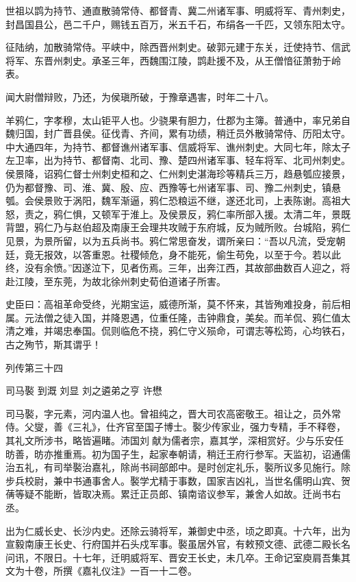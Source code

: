 \documentclass[12pt,UTF8]{ctexbook}
\begin{document}
世祖以鹍为持节、通直散骑常侍、都督青、冀二州诸军事、明威将军、青州刺史，封昌国县公，邑二千户，赐钱五百万，米五千石，布绢各一千匹，又领东阳太守。

征陆纳，加散骑常侍。平峡中，除西晋州刺史。破郭元建于东关，迁使持节、信武将军、东晋州刺史。承圣三年，西魏围江陵，鹍赴援不及，从王僧愔征萧勃于岭表。

闻大尉僧辩败，乃还，为侯瑱所破，于豫章遇害，时年二十八。

羊鸦仁，字孝穆，太山钜平人也。少骁果有胆力，仕郡为主簿。普通中，率兄弟自魏归国，封广晋县侯。征伐青、齐间，累有功绩，稍迁员外散骑常侍、历阳太守。中大通四年，为持节、都督谯州诸军事、信威将军、谯州刺史。大同七年，除太子左卫率，出为持节、都督南、北司、豫、楚四州诸军事、轻车将军、北司州刺史。侯景降，诏鸦仁督士州刺史桓和之、仁州刺史湛海珍等精兵三万，趋悬瓠应接景，仍为都督豫、司、淮、冀、殷、应、西豫等七州诸军事、司、豫二州刺史，镇悬瓠。会侯景败于涡阳，魏军渐逼，鸦仁恐粮运不继，遂还北司，上表陈谢。高祖大怒，责之，鸦仁惧，又顿军于淮上。及侯景反，鸦仁率所部入援。太清二年，景既背盟，鸦仁乃与赵伯超及南康王会理共攻贼于东府城，反为贼所败。台城陷，鸦仁见景，为景所留，以为五兵尚书。鸦仁常思奋发，谓所亲曰：“吾以凡流，受宠朝廷，竟无报效，以答重恩。社稷倾危，身不能死，偷生苟免，以至于今。若以此终，没有余愤。”因遂泣下，见者伤焉。三年，出奔江西，其故部曲数百人迎之，将赴江陵，至东莞，为故北徐州刺史荀伯道诸子所害。

史臣曰：高祖革命受终，光期宝运，威德所渐，莫不怀来，其皆殉难投身，前后相属。元法僧之徒入国，并降恩遇，位重任隆，击钟鼎食，美矣。而羊侃、鸦仁值太清之难，并竭忠奉国。侃则临危不挠，鸦仁守义殒命，可谓志等松筠，心均铁石，古之殉节，斯其谓乎！





列传第三十四

司马褧 到溉 刘显 刘之遴弟之亨 许懋

司马褧，字元素，河内温人也。曾祖纯之，晋大司农高密敬王。祖让之，员外常侍。父燮，善《三礼》，仕齐官至国子博士。褧少传家业，强力专精，手不释卷，其礼文所涉书，略皆遍睹。沛国刘献为儒者宗，嘉其学，深相赏好。少与乐安任昉善，昉亦推重焉。初为国子生，起家奉朝请，稍迁王府行参军。天监初，诏通儒治五礼，有司举褧治嘉礼，除尚书祠部郎中。是时创定礼乐，褧所议多见施行。除步兵校尉，兼中书通事舍人。褧学尤精于事数，国家吉凶礼，当世名儒明山宾、贺蒨等疑不能断，皆取决焉。累迁正员郎、镇南谘议参军，兼舍人如故。迁尚书右丞。

出为仁威长史、长沙内史。还除云骑将军，兼御史中丞，顷之即真。十六年，出为宣毅南康王长史、行府国并石头戍军事。褧虽居外官，有敕预文德、武德二殿长名问讯，不限日。十七年，迁明威将军、晋安王长史，未几卒。王命记室庾肩吾集其文为十卷，所撰《嘉礼仪注》一百一十二卷。
\end{document}
